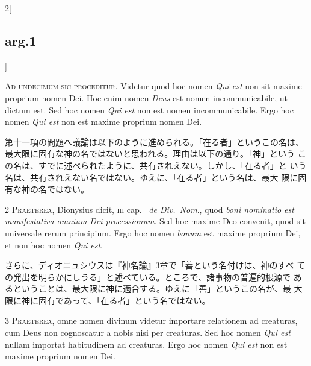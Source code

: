 \documentclass[paper=a4paper,fontsize=10pt,jafontsize=9pt,titlepage]{jlreq}
\begin{document}
\begin{paracol}{2}[\subsection{arg.1}]

{\huge A}{\scshape d undecimum sic proceditur}. Videtur quod hoc nomen
{\itshape Qui est} non sit maxime proprium nomen Dei. Hoc enim nomen
{\itshape Deus} est nomen incommunicabile, ut dictum est. Sed hoc
nomen {\itshape Qui est} non est nomen incommunicabile. Ergo hoc nomen
{\itshape Qui est} non est maxime proprium nomen Dei.

\switchcolumn

第十一項の問題へ議論は以下のように進められる。「在る者」というこの名は、
最大限に固有な神の名ではないと思われる。理由は以下の通り。「神」という
この名は、すでに述べられたように、共有されえない。しかし、「在る者」と
いう名は、共有されえない名ではない。ゆえに、「在る者」という名は、最大
限に固有な神の名ではない。


{\scshape 2 Praeterea}, Dionysius dicit, {\scshape iii} cap.~{\itshape
de Div.~Nom}., quod {\itshape boni nominatio est manifestativa omnium
Dei processionum}. Sed hoc maxime Deo convenit, quod sit universale
rerum principium. Ergo hoc nomen {\itshape bonum} est maxime proprium
Dei, et non hoc nomen {\itshape Qui est}.

\switchcolumn

さらに、ディオニュシウスは『神名論』3章で「善という名付けは、神のすべ
ての発出を明らかにしうる」と述べている。ところで、諸事物の普遍的根源で
あるということは、最大限に神に適合する。ゆえに「善」というこの名が、最
大限に神に固有であって、「在る者」という名ではない。


{\scshape 3 Praeterea}, omne nomen divinum videtur importare
relationem ad creaturas, cum Deus non cognoscatur a nobis nisi per
creaturas. Sed hoc nomen {\itshape Qui est} nullam importat
habitudinem ad creaturas. Ergo hoc nomen {\itshape Qui est} non est
maxime proprium nomen Dei.

\switchcolumn


\end{paracol}
\end{document}
